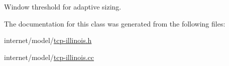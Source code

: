 Window threshold for adaptive sizing. 



The documentation for this class was generated from the following files\+:\begin{DoxyCompactItemize}
\item 
internet/model/\hyperlink{tcp-illinois_8h}{tcp-\/illinois.\+h}\item 
internet/model/\hyperlink{tcp-illinois_8cc}{tcp-\/illinois.\+cc}\end{DoxyCompactItemize}
